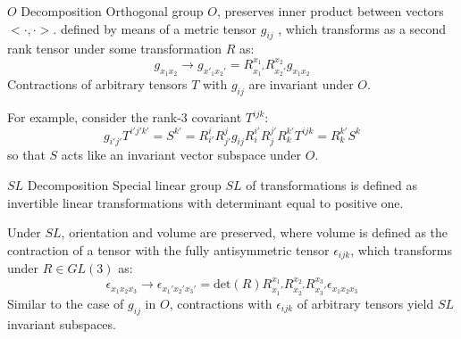 \documentclass[11pt]{beamer}
\begin{document}
\begin{frame}{$O$ Decomposition}
Orthogonal group $O$, preserves inner product between vectors $<\cdot , \cdot >$. defined by means of a metric tensor $g_{ij}$ , which transforms as a second rank tensor under some transformation $R$ as:
$$
g_{x_1x_2}\rightarrow g_{x'_1x_2'} = R_{x_1'}^{x_1} R_{x_2'}^{x_2}g_{x_1x_2}
$$
Contractions of arbitrary tensors $T$ with $g_{ij}$ are invariant under $O$.

\medskip

For example, consider the rank-3 covariant $T^{ijk}$:
$$
g_{i'j'}T^{i'j'k'} = S^{k'}= R_{i'}^{i} R_{j'}^{j} g_{ij}R_{i}^{i'} R_{j}^{j'}R_k^{k'}T^{ijk} = R_k^{k'} S^k
$$
so that $S$ acts like an invariant vector subspace under $O$.
\end{frame}
\begin{frame}{$SL$ Decomposition}
Special linear group $SL$ of transformations is defined as invertible linear transformations with determinant equal to positive one.

\medskip

Under $SL$, orientation and volume are preserved, where volume is defined as the contraction of a tensor with the fully antisymmetric tensor $\epsilon_{ijk}$, which transforms under $R\in GL(3)$ as:
$$
\epsilon_{x_1x_2x_3} \rightarrow\epsilon_{x_1'x_2'x_3'} =\text{det}(R) R_{x_1'}^{x_1} R_{x_2'}^{x_2}R_{x_3'}^{x_3}\epsilon_{x_1x_2x_3} 
$$
Similar to the case of $g_{ij}$ in $O$, contractions with $\epsilon_{ijk}$ of arbitrary tensors yield $SL$ invariant subspaces.
\end{frame}
\end{document}
